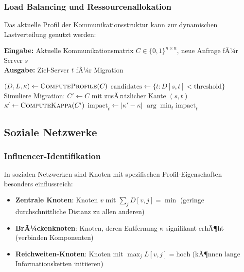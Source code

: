 ﻿\documentclass[a4paper,12pt]{article}
\theoremstyle{definition}
\begin{document}
	\subsubsection{Load Balancing und Ressourcenallokation}
	
	Das aktuelle Profil der Kommunikationsstruktur kann zur dynamischen Lastverteilung genutzt werden:
	
	\begin{algorithm}[H]
		\caption{Profilbasiertes Load Balancing}
		\label{alg:loadbalancing}
		\textbf{Eingabe:} Aktuelle Kommunikationsmatrix $C \in \{0,1\}^{n \times n}$, neue Anfrage fÃ¼r Server $s$ \\
		\textbf{Ausgabe:} Ziel-Server $t$ fÃ¼r Migration
		\begin{algorithmic}[1]
			\State $(D, L, \kappa) \gets \textsc{ComputeProfile}(C)$
			\State $\text{candidates} \gets \{t : D[s,t] < \text{threshold}\}$ 
			\State Simuliere Migration: $C' \gets C$ mit zusÃ¤tzlicher Kante $(s,t)$
			\State $\kappa' \gets \textsc{ComputeKappa}(C')$
			\State $\text{impact}_t \gets |\kappa' - \kappa|$ 
			\EndFor
			\State \Return $\arg\min_t \text{impact}_t$ 
		\end{algorithmic}
	\end{algorithm}
	
	\subsection{Soziale Netzwerke}
	
	\subsubsection{Influencer-Identifikation}
	
	In sozialen Netzwerken sind Knoten mit spezifischen Profil-Eigenschaften besonders einflussreich:
	
	\begin{itemize}
		\item[-] \textbf{Zentrale Knoten}: Knoten $v$ mit $\sum_j D[v,j] = \min$ (geringe durchschnittliche Distanz zu allen anderen)
		\item[-] \textbf{BrÃ¼ckenknoten}: Knoten, deren Entfernung $\kappa$ signifikant erhÃ¶ht (verbinden Komponenten)
		\item[-] \textbf{Reichweiten-Knoten}: Knoten mit $\max_j L[v,j] = \text{hoch}$ (kÃ¶nnen lange Informationsketten initiieren)
	\end{itemize}
	
\end{document}
